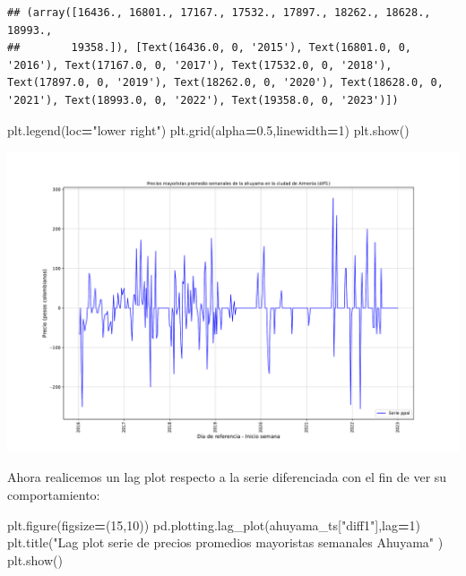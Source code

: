 \documentclass[
]{book}
\newenvironment{Shaded}{\begin{snugshade}}{\end{snugshade}}
\newcommand{\DecValTok}[1]{\textcolor[rgb]{0.00,0.00,0.81}{#1}}
\newcommand{\FloatTok}[1]{\textcolor[rgb]{0.00,0.00,0.81}{#1}}
\newcommand{\NormalTok}[1]{#1}
\newcommand{\OperatorTok}[1]{\textcolor[rgb]{0.81,0.36,0.00}{\textbf{#1}}}
\newcommand{\StringTok}[1]{\textcolor[rgb]{0.31,0.60,0.02}{#1}}
\begin{document}
\begin{verbatim}
## (array([16436., 16801., 17167., 17532., 17897., 18262., 18628., 18993.,
##        19358.]), [Text(16436.0, 0, '2015'), Text(16801.0, 0, '2016'), Text(17167.0, 0, '2017'), Text(17532.0, 0, '2018'), Text(17897.0, 0, '2019'), Text(18262.0, 0, '2020'), Text(18628.0, 0, '2021'), Text(18993.0, 0, '2022'), Text(19358.0, 0, '2023')])
\end{verbatim}

\begin{Shaded}
\begin{Highlighting}[]
\NormalTok{plt.legend(loc}\OperatorTok{=}\StringTok{"lower right"}\NormalTok{)}
\NormalTok{plt.grid(alpha}\OperatorTok{=}\FloatTok{0.5}\NormalTok{,linewidth}\OperatorTok{=}\DecValTok{1}\NormalTok{)}
\NormalTok{plt.show()}
\end{Highlighting}
\end{Shaded}

\includegraphics{bookdown-demo_files/figure-latex/unnamed-chunk-50-9.pdf}

Ahora realicemos un lag plot respecto a la serie diferenciada con el fin de ver su comportamiento:

\begin{Shaded}
\begin{Highlighting}[]

\NormalTok{plt.figure(figsize}\OperatorTok{=}\NormalTok{(}\DecValTok{15}\NormalTok{,}\DecValTok{10}\NormalTok{))}
\NormalTok{pd.plotting.lag\_plot(ahuyama\_ts[}\StringTok{"diff1"}\NormalTok{],lag}\OperatorTok{=}\DecValTok{1}\NormalTok{)}
\NormalTok{plt.title(}\StringTok{"Lag plot serie de precios promedios mayoristas semanales Ahuyama"}\NormalTok{ )}
\NormalTok{plt.show()}
\end{Highlighting}
\end{Shaded}
\end{document}
